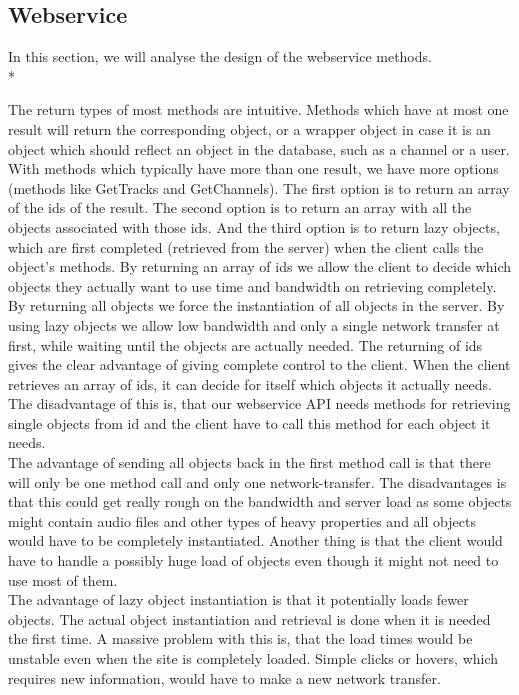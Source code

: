 \documentclass[a4paper,11pt,report]{article}
\begin{document}
\subsection{Webservice}
In this section, we will analyse the design of the webservice methods.  \\*

The return types of most methods are intuitive. Methods which have at most one result will return the corresponding object, or a wrapper object in case it is an object which should reflect an object in the database, such as a channel or a user. \\
With methods which typically have more than one result, we have more options (methods like GetTracks and GetChannels). 
The first option is to return an array of the ids of the result. The second option is to return an array with all the objects associated with those ids. And the third option is to return lazy objects, which are first completed (retrieved from the server) when the client calls the object's methods. By returning an array of ids we allow the client to decide which objects they actually want to use time and bandwidth on retrieving completely. By returning all objects we force the instantiation of all objects in the server. By using lazy objects we allow low bandwidth and only a single network transfer at first, while waiting until the objects are actually needed.
The returning of ids gives the clear advantage of giving complete control to the client. When the client retrieves an array of ids, it can decide for itself which objects it actually needs. The disadvantage of this is, that our webservice API needs methods for retrieving single objects from id and the client have to call this method for each object it needs. \\
The advantage of sending all objects back in the first method call is that there will only be one method call and only one network-transfer. The disadvantages is that this could get really rough on the bandwidth and server load as some objects might contain audio files and other types of heavy properties and all objects would have to be completely instantiated. Another thing is that the client would have to handle a possibly huge load of objects even though it might not need to use most of them. \\
The advantage of lazy object instantiation is that it potentially loads fewer objects. The actual object instantiation and retrieval is done when it is needed the first time. A massive problem with this is, that the load times would be unstable even when the site is completely loaded. Simple clicks or hovers, which requires new information, would have to make a new network transfer. \\
\end{document}
